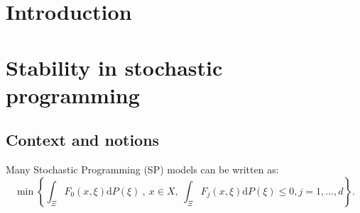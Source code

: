 \documentclass{amsart}
\begin{document}
\section{Introduction}
\section{Stability in stochastic programming}\label{stability}
\subsection{Context and notions}
Many Stochastic Programming (SP) models can be written as:
\begin{equation}\label{stochastic}
\min\left\{\int_\Xi F_0\left(x,\xi\right)\text{d}P\left(\xi\right)\:,\: x\in X, \: \int_\Xi F_j\left(x,\xi\right)\text{d}P\left(\xi\right)\leq0, j=1,...,d\right\}.
\end{equation}
\end{document}

